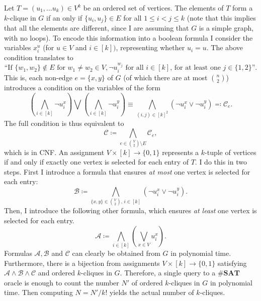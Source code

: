 \documentclass{amsart}
\theoremstyle{plain}
\theoremstyle{definition}
\newcommand{\sharpsat}{\textbf{\#SAT}}
\begin{document}
\begin{enumerate}[label=\textbf{Exercise \arabic*:}, leftmargin=0cm, labelwidth=-0.2cm, align=left]
            Let $T = (u_1, \dots u_k) \in V^k$ be an ordered set of vertices.
            The elements of $T$ form a $k$-clique in $G$ if an only if
            $\{u_i, u_j\} \in E$ for all $1 \leq i < j \leq k$
            (note that this implies that all the elements are different,
            since I are assuming that $G$ is a simple graph, with no loops). %
            To encode this information into a boolean formula I consider
            the variables $x_i^u$ (for $u \in V$ and $i \in [k])$,
            representing whether $u_i = u$.
            The above condition translates to 
            \[
                \text{``If } \{w_1, w_2\} \notin E \text{ for } w_1 \neq w_2 \in V,
                \neg u_i^{w_j} \text{ for all } i \in [k] \text{, for at least one }
                j \in \{1, 2\} \text{''}.
            \]
            This is, each non-edge $e = \{x, y\}$ of $G$ (of which there are at most $\binom{n}{2}$)
            introduces a condition on the variables of the form
            \[
                \left( \bigwedge_{i \in [k]} \neg u_i^x \right) \bigvee \left( \bigwedge_{i \in [k]} \neg u_i^y \right)
                \equiv \bigwedge_{(i, j) \in [k]^2} (\neg u_i^x \lor \neg u_i^y) \eqqcolon \mathcal{C}_e.
            \]
            The full condition is thus equivalent to
            \[
                \mathcal{C} \coloneqq \bigwedge_{e \in \binom{V}{2} \setminus E} \mathcal{C}_{e},
            \]
            which is in CNF.
            An assignment $V \times [k] \to \{0, 1\}$ represents a $k$-tuple of vertices if and only if
            exactly one vertex is selected for each entry of $T$.
            I do this in two steps.
            First I introduce a formula that ensures \emph{at most} one vertex is selected for each entry:
            \[
                \mathcal{B} \coloneqq \bigwedge_{\{x, y\} \in \binom{V}{2},\, i \in [k]} (\neg u_i^x \lor \neg u_i^y).
            \]
            Then, I introduce the following other formula, which ensures \emph{at least} one vertex is selected
            for each entry.
            \[
                \mathcal{A} \coloneqq \bigwedge_{i \in [k]} \left( \bigvee_{x \in V} u_i^x \right).
            \]
            Formulas $\mathcal{A}, \mathcal{B}$ and $\mathcal{C}$
            can clearly be obtained from $G$ in polynomial time.
            Furthermore, there is a bijection from assignments
            $V \times [k] \to \{0, 1\}$ satisfying
            $\mathcal{A} \land \mathcal{B} \land \mathcal{C}$
            and ordered $k$-cliques in $G$.
            Therefore, a single query to a $\sharpsat$ oracle is enough to count the number $N'$ of ordered
            $k$-cliques in $G$ in polynomial time.
            Then computing $N = N' / k!$ yields the actual number of $k$-cliques.

    \end{enumerate}
\end{document}
